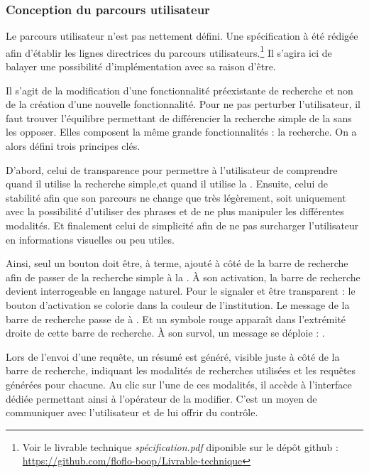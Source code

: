 \subsubsection{Conception du parcours utilisateur}

Le parcours utilisateur n'est pas nettement défini. Une spécification à été rédigée afin d'établir les lignes directrices du parcours utilisateurs.\footnote{Voir le livrable technique \textit{spécification.pdf} diponible sur le dépôt github : \url{https://github.com/floflo-boop/Livrable-technique}} Il s'agira ici de balayer une possibilité d'implémentation avec sa raison d'être. 

Il s'agit de la modification d'une fonctionnalité préexistante de recherche et non de la création d'une nouvelle fonctionnalité. Pour ne pas perturber l'utilisateur, il faut trouver l'équilibre permettant de différencier la recherche simple de la  sans les opposer. Elles composent la même grande fonctionnalités : la recherche. On a alors défini trois principes clés. 

D'abord, celui de transparence pour permettre à l'utilisateur de comprendre quand il utilise la recherche simple,et quand il utilise la . Ensuite, celui de stabilité afin que son parcours ne change que très légèrement, soit uniquement avec la possibilité d'utiliser des phrases et de ne plus manipuler les différentes modalités. Et finalement celui de simplicité afin de ne pas surcharger l'utilisateur en informations visuelles ou peu utiles.\newline

Ainsi, seul un bouton doit être, à terme, ajouté à côté de la barre de recherche afin de passer de la recherche simple à la . À son activation, la barre de recherche devient interrogeable en langage naturel. Pour le signaler et être transparent : le bouton d'activation se colorie dans la couleur de l'institution. Le message de la barre de recherche passe de  à . Et un symbole rouge apparaît dans l'extrémité droite de cette barre de recherche. À son survol, un message se déploie : .

Lors de l'envoi d'une requête, un résumé est généré, visible juste à côté de la barre de recherche, indiquant les modalités de recherches utilisées et les requêtes générées pour chacune. Au clic sur l'une de ces modalités, il accède à l'interface dédiée permettant ainsi à l'opérateur de la modifier. C'est un moyen de communiquer avec l'utilisateur et de lui offrir du contrôle. 

